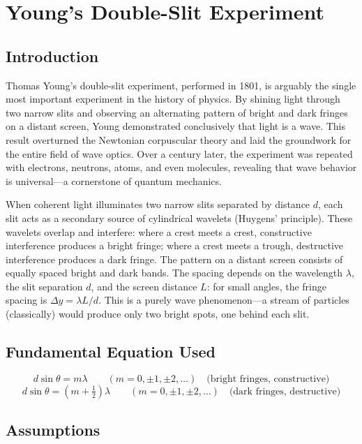 \chapter{Young's Double-Slit Experiment}

\section*{Introduction}

Thomas Young's double-slit experiment, performed in 1801, is arguably the single most important experiment in the history of physics. By shining light through two narrow slits and observing an alternating pattern of bright and dark fringes on a distant screen, Young demonstrated conclusively that light is a wave. This result overturned the Newtonian corpuscular theory and laid the groundwork for the entire field of wave optics. Over a century later, the experiment was repeated with electrons, neutrons, atoms, and even molecules, revealing that wave behavior is universal---a cornerstone of quantum mechanics.

When coherent light illuminates two narrow slits separated by distance $d$, each slit acts as a secondary source of cylindrical wavelets (Huygens' principle). These wavelets overlap and interfere: where a crest meets a crest, constructive interference produces a bright fringe; where a crest meets a trough, destructive interference produces a dark fringe. The pattern on a distant screen consists of equally spaced bright and dark bands. The spacing depends on the wavelength $\lambda$, the slit separation $d$, and the screen distance $L$: for small angles, the fringe spacing is $\Delta y = \lambda L/d$. This is a purely wave phenomenon---a stream of particles (classically) would produce only two bright spots, one behind each slit.
\section*{Fundamental Equation Used}

\begin{equation}
d\sin\theta = m\lambda \qquad (m = 0, \pm 1, \pm 2, \ldots) \quad \text{(bright fringes, constructive)}
\end{equation}
\begin{equation}
d\sin\theta = \left(m + \tfrac{1}{2}\right)\lambda \qquad (m = 0, \pm 1, \pm 2, \ldots) \quad \text{(dark fringes, destructive)}
\end{equation}
\section*{Assumptions}

